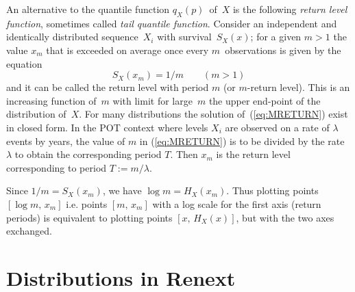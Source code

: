 \documentclass[a4paper]{report}
\newenvironment{Prov}
   {\medskip \par \noindent%
    \sf \color{blue} }%
  {\medskip \par}
\begin{document}
An alternative to the quantile function $q_X(p)$~of~$X$ is the following
\textit{return level function}, sometimes called \textit{tail quantile function}. 
%
%
Consider an independent and identically distributed sequence~$X_i$
with survival~$S_X(x)$; for a given $m>1$ the value $x_m$ that is
exceeded on average once every $m$~observations is given by the
equation
\begin{equation}
  \label{eq:MRETURN}
    S_X(x_m) = 1/m  \qquad (m > 1)
\end{equation}
and it can be called the return level with period $m$ (or $m$-return
level).  This is an increasing function of~$m$ with limit for
large~$m$ the upper end-point of the distribution of~$X$. For many
distributions the solution of~(\ref{eq:MRETURN}) exist in closed
form. In the POT context where levels $X_i$ are observed on a rate of
$\lambda$ events by years, the value of $m$ in (\ref{eq:MRETURN}) is
to be divided by the rate $\lambda$ to obtain the corresponding period
$T$. Then $x_m$ is the return level corresponding to period
$T:=m/\lambda$.

Since $1/m = S_X(x_m)$, we have $\log m = H_X(x_m)$. Thus plotting
points $[\log m,\,x_m]$ i.e. points $[m,\,x_m]$ with a log scale for
the first axis (return periods) is equivalent to plotting points
$[x,\,H_X(x)]$, but with the two axes exchanged.


\section{Distributions in Renext}
\end{document}
